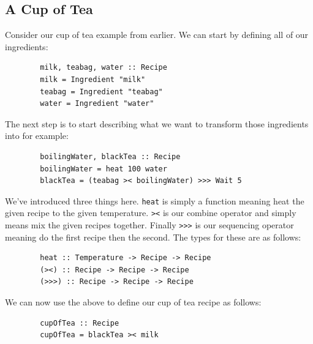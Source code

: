 \documentclass[11pt]{article}
\begin{document}
    \subsection{A Cup of Tea}
    Consider our cup of tea example from earlier. We can start by
    defining all of our ingredients:

    \begin{tt}
    \small
    \begin{lstlisting}
        milk, teabag, water :: Recipe
        milk = Ingredient "milk"
        teabag = Ingredient "teabag"
        water = Ingredient "water"
    \end{lstlisting}
    \end{tt}

    The next step is to start describing what we want to transform
    those ingredients into for example:

    \begin{tt}
    \small
    \begin{lstlisting}
        boilingWater, blackTea :: Recipe
        boilingWater = heat 100 water
        blackTea = (teabag >< boilingWater) >>> Wait 5
    \end{lstlisting}
    \end{tt}

    We've introduced three things here. \texttt{heat} is simply
    a function meaning heat the given recipe to the given temperature.
    \texttt{><} is our combine operator and simply means mix the
    given recipes together. Finally \texttt{>>>} is our sequencing
    operator meaning do the first recipe then the second. The types
    for these are as follows: 
    
    \begin{tt}
    \small
    \begin{lstlisting}
        heat :: Temperature -> Recipe -> Recipe
        (><) :: Recipe -> Recipe -> Recipe
        (>>>) :: Recipe -> Recipe -> Recipe
    \end{lstlisting}
    \end{tt}

    We can now use the above to define our cup of tea recipe as follows:

    \begin{tt}
    \small
    \begin{lstlisting}
        cupOfTea :: Recipe
        cupOfTea = blackTea >< milk
    \end{lstlisting}
    \end{tt}
\end{document}
